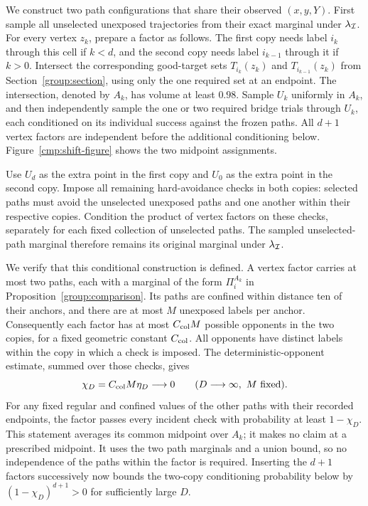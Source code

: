 We construct two path configurations that share their observed $(x,y,Y)$.
First sample all unselected unexposed trajectories from their exact marginal
under $\lambda_{\mathcal I}$. For every vertex $z_k$, prepare a factor as follows.
The first copy needs label $i_k$ through this cell if $k<d$, and the second
copy needs label $i_{k-1}$ through it if $k>0$. Intersect the corresponding
good-target sets $T_{i_k}(z_k)$ and $T_{i_{k-1}}(z_k)$ from
Section~\ref{group:section}, using only the one required set at an endpoint.
The intersection, denoted by $A_k$, has volume at least $0.98$.
Sample $U_k$ uniformly in $A_k$, and then independently sample the one or
two required bridge trials through $U_k$, each conditioned on its individual
success against the frozen paths. All $d+1$ vertex factors are independent
before the additional conditioning below. Figure~\ref{cmp:shift-figure}
shows the two midpoint assignments.

Use $U_d$ as the extra point in the first copy and $U_0$ as the extra point
in the second copy. Impose all remaining hard-avoidance checks in both
copies: selected paths must avoid the unselected unexposed paths and one another
within their respective copies. Condition the product of vertex factors on
these checks, separately for each fixed collection of unselected paths.
The sampled unselected-path marginal therefore remains its original marginal
under $\lambda_{\mathcal I}$.

We verify that this conditional construction is defined. A vertex factor
carries at most two paths, each with a marginal of the form $\Pi_i^{A_k}$
in Proposition~\ref{group:comparison}. Its paths are confined within distance
ten of their anchors, and there are at most $M$ unexposed labels per anchor.
Consequently each factor has at most $C_{\rm col}M$ possible opponents in the two
copies, for a fixed geometric constant $C_{\rm col}$. All opponents have distinct labels within the copy in which a check
is imposed. The deterministic-opponent estimate, summed over those checks,
gives
\begin{equation}\label{cmp:compatibility}
 \chi_D=C_{\rm col}M\eta_D\longrightarrow0
 \qquad(D\longrightarrow\infty,\ M\text{ fixed}).
\end{equation}
For any fixed regular and confined values of the other paths with their
recorded endpoints, the factor passes every incident check with probability
at least $1-\chi_D$.
This statement averages its common midpoint over $A_k$; it makes no claim at
a prescribed midpoint. It uses the two path marginals and a union bound,
so no independence of the paths within the factor is required. Inserting
the $d+1$ factors successively now bounds the two-copy conditioning
probability below by $(1-\chi_D)^{d+1}>0$ for sufficiently large $D$.

